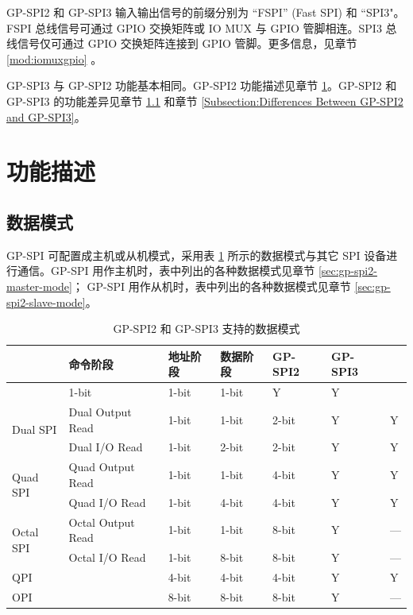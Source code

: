 \documentclass[main\_\_CN.tex]{subfiles}
\begin{document}
GP-SPI2 和 GP-SPI3 输入输出信号的前缀分别为 “FSPI” (Fast SPI) 和 ``SPI3"。
FSPI 总线信号可通过 GPIO 交换矩阵或 IO MUX 与 GPIO 管脚相连。SPI3 总线信号仅可通过 GPIO 交换矩阵连接到 GPIO 管脚。更多信息，见章节 \ref{mod:iomuxgpio} \textit{}。

GP-SPI3 与 GP-SPI2 功能基本相同。GP-SPI2 功能描述见章节 \ref{sec:gp-spi-interfaces}。GP-SPI2 和 GP-SPI3 的功能差异见章节  \ref{Subsection:data-modes} 和章节  \ref{Subsection:Differences Between GP-SPI2 and GP-SPI3}。


\section{功能描述}\label{sec:gp-spi-interfaces}

\subsection{数据模式}\label{Subsection:data-modes}
GP-SPI 可配置成主机或从机模式，采用表  \ref{tab:data-modes} 所示的数据模式与其它 SPI 设备进行通信。GP-SPI 用作主机时，表中列出的各种数据模式见章节  \ref{sec:gp-spi2-master-mode}；
GP-SPI 用作从机时，表中列出的各种数据模式见章节  \ref{sec:gp-spi2-slave-mode}。

\begin{longtable}{|l|l|l|l|l|l|l|}
\caption{GP-SPI2 和 GP-SPI3 支持的数据模式}
\label{tab:data-modes}\\
\hline
\rowcolor{lightgray}
\multicolumn{2}{|l|}{\textbf{数据模式}}            & \textbf{命令阶段}& \textbf{地址阶段}& \textbf{数据阶段}& \textbf{GP-SPI2} & \textbf{GP-SPI3} \\ \hline
\endfirsthead

    \endlastfoot
\multicolumn{2}{|l|}{1-bit SPI}                       & 1-bit   & 1-bit       & 1-bit    & Y       & Y       \\ \hline
\multirow{2}{*}{Dual   SPI} & Dual Output Read  & 1-bit   & 1-bit       & 2-bit    & Y       & Y      \\ \cline{2-7}
                            & Dual I/O Read     & 1-bit   & 2-bit       & 2-bit    & Y       & Y     \\ \hline
\multirow{2}{*}{Quad SPI}   & Quad Output Read  & 1-bit   & 1-bit       & 4-bit    & Y       & Y      \\ \cline{2-7}
                            & Quad I/O Read     & 1-bit   & 4-bit       & 4-bit    & Y       & Y      \\ \hline
\multirow{2}{*}{Octal SPI}  & Octal Output Read & 1-bit   & 1-bit       & 8-bit    & Y       & ---      \\ \cline{2-7}
                            & Octal I/O Read    & 1-bit   & 8-bit       & 8-bit    & Y       & ---      \\ \hline
\multicolumn{2}{|l|}{QPI}                       & 4-bit   & 4-bit       & 4-bit    & Y       & Y      \\ \hline
\multicolumn{2}{|l|}{OPI}                       & 8-bit   & 8-bit       & 8-bit    & Y       & ---      \\ \hline
\end{longtable}
\end{document}
